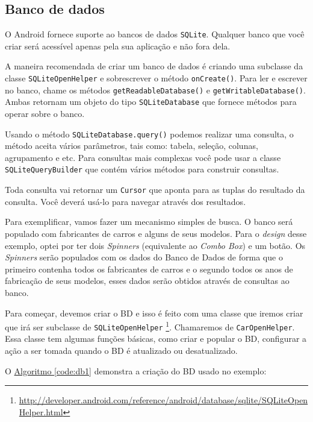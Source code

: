 \documentclass[a4paper,12pt,brazil,oneside]{book}
\begin{document}
\begin{singlespace}
		\section{Banco de dados}

		O Android fornece suporte ao bancos de dados \texttt{SQLite}. Qualquer banco que você criar será acessível apenas pela sua aplicação e não fora dela.

		A maneira recomendada de criar um banco de dados é criando uma subclasse da classe \texttt{SQLiteOpenHelper} e sobrescrever o método \texttt{onCreate()}. Para ler e escrever no banco, chame os métodos \texttt{getReadableDatabase()} e \texttt{getWritableDatabase()}. Ambas retornam um objeto do tipo \texttt{SQLiteDatabase} que fornece métodos para operar sobre o banco.

		Usando o método \texttt{SQLiteDatabase.query()}  podemos realizar uma consulta, o método aceita vários parâmetros, tais como: tabela, seleção, colunas, agrupamento e etc. Para consultas mais complexas você pode usar a classe \texttt{SQLiteQueryBuilder} que contém vários métodos para construir consultas.

		Toda consulta vai retornar um \texttt{Cursor} que aponta para as tuplas do resultado da consulta. Você deverá usá-lo para navegar através dos resultados.

		Para exemplificar, vamos fazer um mecanismo simples de busca. O banco será populado com fabricantes de carros e alguns de seus modelos. Para o \emph{design} desse exemplo, optei por ter dois \emph{Spinners} (equivalente ao \emph{Combo Box}) e um botão. Os \emph{Spinners} serão populados com os dados do Banco de Dados de forma que o primeiro contenha todos os fabricantes de carros e o segundo todos os anos de fabricação de seus modelos, esses dados serão obtidos através de consultas ao banco.

		Para começar, devemos  criar o BD e isso é feito com uma classe que iremos criar que irá ser subclasse de \texttt{SQLiteOpenHelper}
\footnote{\href{http://developer.android.com/reference/android/database/sqlite/SQLiteOpenHelper.html}{http://developer.android.com/reference/android/database/sqlite/SQLiteOpenHelper.html}}.
 Chamaremos de \texttt{CarOpenHelper}. Essa classe tem algumas funções básicas, como criar e popular o BD, configurar a ação a ser tomada quando o BD é atualizado ou desatualizado.

		O \hyperref[code:db1]{Algoritmo \ref*{code:db1}} demonstra a criação do BD usado no exemplo:


\end{singlespace}
\end{document}
